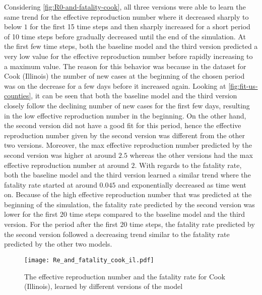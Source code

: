 Considering \autoref{fig:R0-and-fatality-cook}, all three versions were able to learn the same trend for the effective reproduction number where it decreased sharply to below $1$ for the first 15 time steps and then sharply increased for a short period of 10 time steps before gradually decreased until the end of the simulation.
At the first few time steps, both the baseline model and the third version predicted a very low value for the effective reproduction number before rapidly increasing to a maximum value.
The reason for this behavior was because in the dataset for Cook (Illinois) the number of new cases at the beginning of the chosen period was on the decrease for a few days before it increased again.
Looking at \autoref{fig:fit-us-counties}, it can be seen that both the baseline model and the third version closely follow the declining number of new cases for the first few days, resulting in the low effective reproduction number in the beginning.
On the other hand, the second version did not have a good fit for this period, hence the effective reproduction number given by the second version was different from the other two versions.
Moreover, the max effective reproduction number predicted by the second version was higher at around $2.5$ whereas the other versions had the max effective reproduction number at around $2$.
With regards to the fatality rate, both the baseline model and the third version learned a similar trend where the fatality rate started at around $0.045$ and exponentially decreased as time went on.
Because of the high effective reproduction number that was predicted at the beginning of the simulation, the fatality rate predicted by the second version was lower for the first $20$ time steps compared to the baseline model and the third version.
For the period after the first $20$ time steps, the fatality rate predicted by the second version followed a decreasing trend similar to the fatality rate predicted by the other two models.

\begin{figure}[!htb]
    \centering
    \texttt{[image: Re\_and\_fatality\_cook\_il.pdf]}
    \caption{The effective reproduction number and the fatality rate for Cook (Illinois), learned by different versions of the model}
    \label{fig:R0-and-fatality-cook}
\end{figure}

